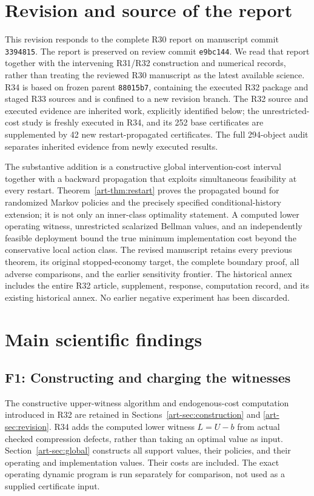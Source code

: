\section{Revision and source of the report}
This revision responds to the complete R30 report on manuscript commit \texttt{3394815}. The report is preserved on review commit \texttt{e9bc144}. We read that report together with the intervening R31/R32 construction and numerical records, rather than treating the reviewed R30 manuscript as the latest available science. R34 is based on frozen parent \texttt{88015b7}, containing the executed R32 package and staged R33 sources and is confined to a new revision branch. The R32 source and executed evidence are inherited work, explicitly identified below; the unrestricted-cost study is freshly executed in R34, and its 252 base certificates are supplemented by 42 new restart-propagated certificates. The full 294-object audit separates inherited evidence from newly executed results.

The substantive addition is a constructive global intervention-cost interval together with a backward propagation that exploits simultaneous feasibility at every restart. Theorem~\ref{art-thm:restart} proves the propagated bound for randomized Markov policies and the precisely specified conditional-history extension; it is not only an inner-class optimality statement. A computed lower operating witness, unrestricted scalarized Bellman values, and an independently feasible deployment bound the true minimum implementation cost beyond the conservative local action class. The revised manuscript retains every previous theorem, its original stopped-economy target, the complete boundary proof, all adverse comparisons, and the earlier sensitivity frontier. The historical annex includes the entire R32 article, supplement, response, computation record, and its existing historical annex. No earlier negative experiment has been discarded.

\section{Main scientific findings}
\subsection{F1: Constructing and charging the witnesses}
The constructive upper-witness algorithm and endogenous-cost computation introduced in R32 are retained in Sections~\ref{art-sec:construction} and \ref{art-sec:revision}. R34 adds the computed lower witness $L=U-b$ from actual checked compression defects, rather than taking an optimal value as input. Section~\ref{art-sec:global} constructs all support values, their policies, and their operating and implementation values. Their costs are included. The exact operating dynamic program is run separately for comparison, not used as a supplied certificate input.

